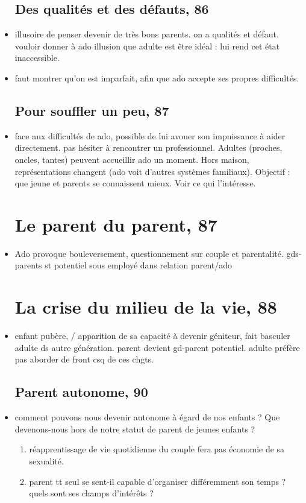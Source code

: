 \documentclass[12pt]{report}
\begin{document}
\begin{itemize}
\subsection{Des qualités et des défauts, 86}
\item illusoire de penser devenir de très bons parents. on a qualités et défaut. vouloir donner à ado illusion que adulte est être idéal : lui rend cet état inaccessible. \\

\item faut montrer qu'on est imparfait, afin que ado accepte ses propres difficultés. \\


\subsection{Pour souffler un peu, 87}
\item face aux difficultés de ado, possible de lui avouer son impuissance à aider directement. pas hésiter à rencontrer un professionnel. Adultes (proches, oncles, tantes) peuvent accueillir ado un moment. Hors maison, représentations changent (ado voit d'autres systèmes familiaux). Objectif : que jeune et parents se connaissent mieux. Voir ce qui l'intéresse. 



\section{Le parent du parent, 87}
\item Ado provoque bouleversement, questionnement sur couple et parentalité.  gds-parents st potentiel sous employé dans relation parent/ado


\section{La crise du milieu de la vie, 88}

\item enfant pubère, / apparition de sa capacité à devenir géniteur, fait basculer adulte ds autre génération. parent devient gd-parent potentiel. adulte préfère pas aborder de front csq de ces chgts. 

\subsection{Parent autonome, 90}

\item comment pouvons nous devenir autonome à égard de nos enfants ? Que devenons-nous hors de notre statut de parent de jeunes enfants ? 
\begin{enumerate}
\item réapprentissage de vie quotidienne du couple fera pas économie de sa sexualité. \\
\item parent tt seul se sent-il capable d'organiser différemment son temps ? quels sont ses champs d'intérêts ?
\end{enumerate}


\end{itemize}
\end{document}
